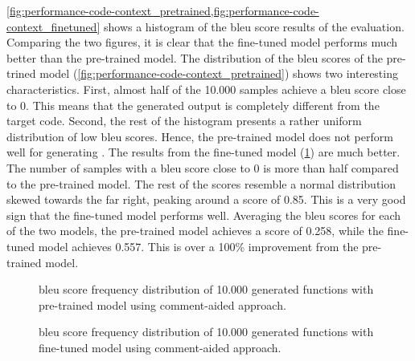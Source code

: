 \cref{fig:performance-code-context_pretrained,fig:performance-code-context_finetuned} shows a histogram of the \acrshort{bleu} score results of the evaluation. Comparing the two figures, it is clear that the fine-tuned model performs much better than the pre-trained model. The distribution of the \acrshort{bleu} scores of the pre-trined model (\cref{fig:performance-code-context_pretrained}) shows two interesting characteristics. First, almost half of the 10.000 samples achieve a \acrshort{bleu} score close to 0. This means that the generated output is completely different from the target code. Second, the rest of the histogram presents a rather uniform distribution of low \acrshort{bleu} scores. Hence, the pre-trained model does not perform well for generating . The results from the fine-tuned model (\cref{fig:performance-code-context_finetuned}) are much better. The number of samples with a \acrshort{bleu} score close to 0 is more than half compared to the pre-trained model. The rest of the scores resemble a normal distribution skewed towards the far right, peaking around a score of 0.85. This is a very good sign that the fine-tuned model performs well. Averaging the \acrshort{bleu} scores for each of the two models, the pre-trained model achieves a score of 0.258, while the fine-tuned model achieves 0.557. This is over a 100\% improvement from the pre-trained model.

\begin{figure}[htp]
    \centering
    
    \caption{\acrshort{bleu} score frequency distribution of 10.000 generated functions with pre-trained model using comment-aided approach.}
    \label{fig:performance-code-context_pretrained}
    \vspace*{\floatsep}%
    
    \caption{\acrshort{bleu} score frequency distribution of 10.000 generated functions with fine-tuned model using comment-aided approach.}
    \label{fig:performance-code-context_finetuned}
\end{figure}

%
%
%


